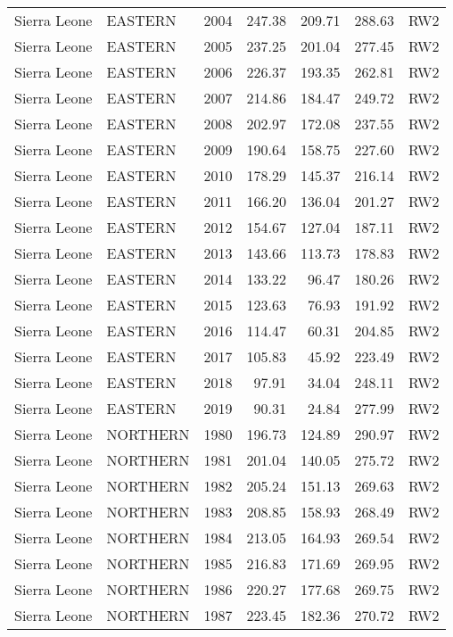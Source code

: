 \begin{longtable}{lllrrrl}
  Sierra Leone & EASTERN & 2004 & 247.38 & 209.71 & 288.63 & RW2 \\ 
  Sierra Leone & EASTERN & 2005 & 237.25 & 201.04 & 277.45 & RW2 \\ 
  Sierra Leone & EASTERN & 2006 & 226.37 & 193.35 & 262.81 & RW2 \\ 
  Sierra Leone & EASTERN & 2007 & 214.86 & 184.47 & 249.72 & RW2 \\ 
  Sierra Leone & EASTERN & 2008 & 202.97 & 172.08 & 237.55 & RW2 \\ 
  Sierra Leone & EASTERN & 2009 & 190.64 & 158.75 & 227.60 & RW2 \\ 
  Sierra Leone & EASTERN & 2010 & 178.29 & 145.37 & 216.14 & RW2 \\ 
  Sierra Leone & EASTERN & 2011 & 166.20 & 136.04 & 201.27 & RW2 \\ 
  Sierra Leone & EASTERN & 2012 & 154.67 & 127.04 & 187.11 & RW2 \\ 
  Sierra Leone & EASTERN & 2013 & 143.66 & 113.73 & 178.83 & RW2 \\ 
  Sierra Leone & EASTERN & 2014 & 133.22 & 96.47 & 180.26 & RW2 \\ 
  Sierra Leone & EASTERN & 2015 & 123.63 & 76.93 & 191.92 & RW2 \\ 
  Sierra Leone & EASTERN & 2016 & 114.47 & 60.31 & 204.85 & RW2 \\ 
  Sierra Leone & EASTERN & 2017 & 105.83 & 45.92 & 223.49 & RW2 \\ 
  Sierra Leone & EASTERN & 2018 & 97.91 & 34.04 & 248.11 & RW2 \\ 
  Sierra Leone & EASTERN & 2019 & 90.31 & 24.84 & 277.99 & RW2 \\ 
  Sierra Leone & NORTHERN & 1980 & 196.73 & 124.89 & 290.97 & RW2 \\ 
  Sierra Leone & NORTHERN & 1981 & 201.04 & 140.05 & 275.72 & RW2 \\ 
  Sierra Leone & NORTHERN & 1982 & 205.24 & 151.13 & 269.63 & RW2 \\ 
  Sierra Leone & NORTHERN & 1983 & 208.85 & 158.93 & 268.49 & RW2 \\ 
  Sierra Leone & NORTHERN & 1984 & 213.05 & 164.93 & 269.54 & RW2 \\ 
  Sierra Leone & NORTHERN & 1985 & 216.83 & 171.69 & 269.95 & RW2 \\ 
  Sierra Leone & NORTHERN & 1986 & 220.27 & 177.68 & 269.75 & RW2 \\ 
  Sierra Leone & NORTHERN & 1987 & 223.45 & 182.36 & 270.72 & RW2 \\ 

\end{longtable}
